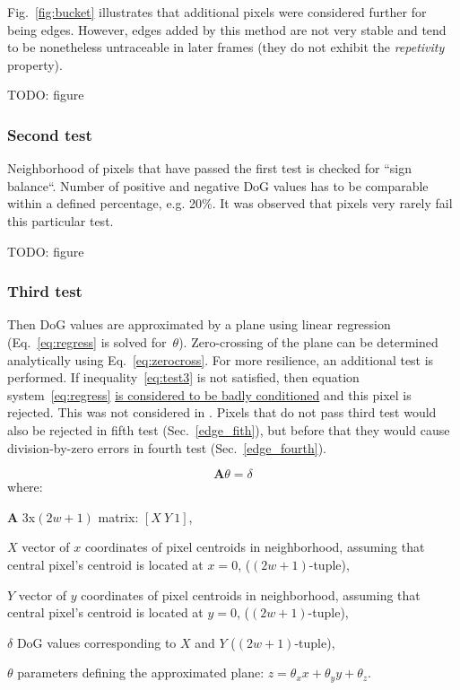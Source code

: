 Fig.~\ref{fig:bucket} illustrates that additional pixels were considered further for being edges. However, edges added by this method are not very stable and tend to be nonetheless untraceable in later frames (they do not exhibit the \textit{repetivity} property).

TODO: figure

\subsubsection{Second test}
\label{edge_second}

Neighborhood of pixels that have passed the first test is checked for ``sign balance``. Number of positive and negative DoG values has to be comparable within a defined percentage, e.g. 20\%. It was observed that pixels very rarely fail this particular test.

TODO: figure

\subsubsection{Third test}
\label{edge_third}

Then DoG values are approximated by a plane using linear regression (Eq.~\ref{eq:regress} is solved for~$\theta$). Zero-crossing of the plane can be determined analytically using Eq.~\ref{eq:zerocross}. For more resilience, an additional test is performed. If inequality~\ref{eq:test3} is not satisfied, then equation system~\ref{eq:regress} \underline{is considered to be badly conditioned} and this pixel is rejected. This was not considered in \cite{jose2015realtime}. Pixels that do not pass third test would also be rejected in fifth test (Sec.~\ref{edge_fith}), but before that they would cause division-by-zero errors in fourth test (Sec.~\ref{edge_fourth}).

\begin{equation}
\bm{A}\theta = \delta
\label{eq:regress}
\end{equation}
where:
\begin{eqwhere}[2cm]
	\item[$\bm{A}$] 3x$(2w+1)$ matrix: $[X\ Y\ 1]$,
	\item[$X$] vector of $x$ coordinates of pixel centroids in neighborhood, assuming that central pixel's centroid is located at $x = 0$, ($(2w+1)$-tuple),
	\item[$Y$] vector of $y$ coordinates of pixel centroids in neighborhood, assuming that central pixel's centroid is located at $y = 0$, ($(2w+1)$-tuple),
	\item[$\delta$] DoG values corresponding to $X$ and $Y$ ($(2w+1)$-tuple),
	\item[$\theta$] parameters defining the approximated plane: $z = \theta_{x}x + \theta_{y}y + \theta_{z}$.
\end{eqwhere}



